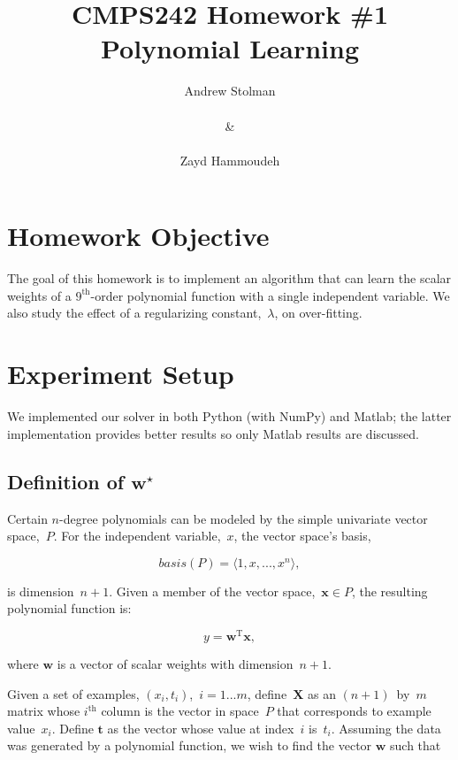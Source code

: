 \documentclass{report}
\title{\textbf{CMPS242 Homework \#1 \textendash{} Polynomial Learning}}
\author{Andrew Stolman \\~\\ \& \\~\\Zayd Hammoudeh}
\newcommand{\wstar}{\mathbf{w}^{\star}}
\begin{document}
  \maketitle
  
 
  \section{Homework Objective}
  
  The goal of this homework is to implement an algorithm that can learn the scalar weights of a {$9^{\text{th}}$-order} polynomial function with a single independent variable.  We also study the effect of a regularizing constant,~$\lambda$, on over-fitting.
  
  \section{Experiment Setup}
  
  We implemented our solver in both Python (with NumPy) and Matlab; the latter implementation provides better results so only Matlab results are discussed.  
  
  \subsection{Definition of $\wstar$}
  
  Certain $n$-degree polynomials can be modeled by the simple univariate vector space,~$P$.  For the independent variable,~$x$, the vector space's basis,
  
  \begin{equation*}
    basis(P)=\langle 1,x,...,x^{n}\rangle,
    \label{eq:foo}
  \end{equation*}
  
  \noindent
  is dimension~$n+1$.  Given a member of the vector space,~${\mathbf{x} \in P}$, the resulting polynomial function is:
  
  \begin{equation}
    y=\mathbf{w}^{\text{T}}\mathbf{x},
    \label{eq:polynomial}
  \end{equation}
  
  \noindent
  where $\mathbf{w}$ is a vector of scalar weights with dimension~$n+1$.
  
  Given a set of examples, $(x_{i},t_{i})$,~$i=1...m$, define~$\mathbf{X}$ as an $(n+1)$~by~$m$ matrix whose $i^{\text{th}}$ column is the vector in space~$P$ that corresponds to example value~$x_{i}$.  Define  $\mathbf{t}$ as the vector whose value at index~$i$ is~$t_{i}$.  Assuming the data was generated by a polynomial function, we wish to find the vector $\mathbf{w}$ such that
  
\end{document}
